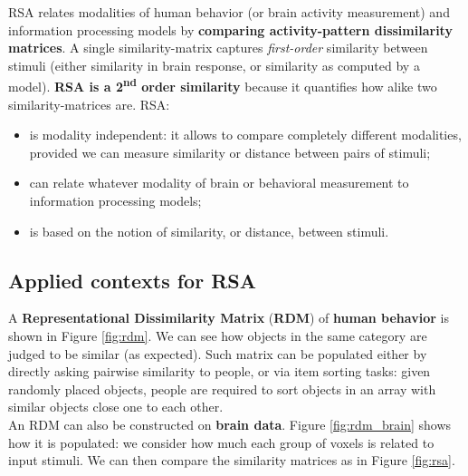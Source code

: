 RSA relates modalities of human behavior (or brain activity measurement) and information processing models by \textbf{comparing activity-pattern dissimilarity matrices}. A single similarity-matrix captures \textit{first-order} similarity between stimuli (either similarity in brain response, or similarity as computed by a  model). \textbf{RSA is a 2\textsuperscript{nd} order similarity} because it quantifies how alike two similarity-matrices are.
RSA:
\begin{itemize}
    \item is modality independent: it allows to compare completely different modalities, provided we can measure similarity or distance between pairs of stimuli;
    \item can relate whatever modality of brain or behavioral  measurement to information processing models;
    \item is based on the notion of similarity, or distance, between stimuli.
\end{itemize}

\subsection{Applied contexts for RSA}

A \textbf{Representational Dissimilarity Matrix} (\textbf{RDM}) of \textbf{human behavior} is shown in Figure \ref{fig:rdm}. We can see how objects in the same category are judged to be similar (as expected). Such matrix can be populated either by directly asking pairwise similarity to people, or via item sorting tasks: given randomly placed objects, people are required to sort objects in an array with similar objects close one to each other.\\

An RDM can also be constructed on \textbf{brain data}. Figure \ref{fig:rdm_brain} shows how it is populated: we consider how much each group of voxels is related to input stimuli. We can then compare the similarity matrices as in Figure \ref{fig:rsa}.

